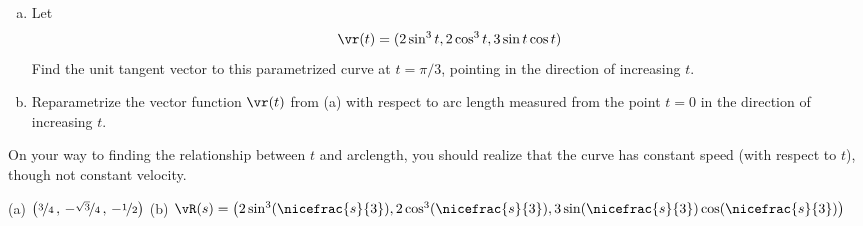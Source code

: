 \subsection*{\Procedural}


\begin{question}[M317 2012D] %

\begin{enumerate}[(a)]
\item
Let
\begin{equation*}
\vr(t) = (2 \sin^3 t , 2\cos^3 t, 3 \sin t \cos t)
\end{equation*}
Find the unit tangent vector to this parametrized curve at $t = \pi/3$, 
pointing in the direction of increasing $t$.
\item
Reparametrize the vector function $\vr(t)$ from (a) with respect to 
arc length measured from the point $t = 0$ in the direction of increasing $t$.
\end{enumerate}
\end{question}

\begin{hint} 
On your way to finding the relationship between $t$ and arclength, you should realize that the curve has constant speed (with respect to $t$), though not constant velocity.
\end{hint}

\begin{answer} 
(a) $\big(\nicefrac{3}{4}\,,\,
                -\nicefrac{\sqrt{3}}{4}\,,\,-\nicefrac{1}{2}\big)$\qquad
(b) $\vR(s) = \big(2 \sin^3(\nicefrac{s}{3}) , 2\cos^3(\nicefrac{s}{3}), 
       3 \sin(\nicefrac{s}{3}) \cos(\nicefrac{s}{3})\big)$
\end{answer}

